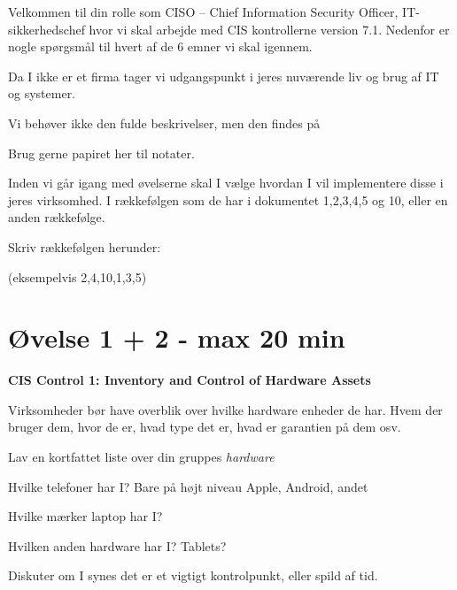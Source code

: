 \documentclass[a4paper,11pt,notitlepage,landscape]{report}
\begin{document}
\rm
{}

\newcommand{\subject}[1]{Workshop 3: cybersikkerhed i virksomheder}



\normal

Velkommen til din rolle som CISO -- Chief Information Security Officer, IT-sikkerhedschef hvor vi skal arbejde med CIS kontrollerne version 7.1. Nedenfor er nogle spørgsmål til hvert af de 6 emner vi skal igennem.

Da I ikke er et firma tager vi udgangspunkt i jeres nuværende liv og brug af IT og systemer.

Vi behøver ikke den fulde beskrivelser, men den findes på 

Brug gerne papiret her til notater.

Inden vi går igang med øvelserne skal I vælge hvordan I vil implementere disse i jeres virksomhed. I rækkefølgen som de har i dokumentet 1,2,3,4,5 og 10, eller en anden rækkefølge.

Skriv rækkefølgen herunder:

\vskip 5mm
(eksempelvis 2,4,10,1,3,5)

\eject
\section*{Øvelse 1 + 2 - max 20 min}

{\bf CIS Control 1: Inventory and Control of Hardware Assets}

Virksomheder bør have overblik over hvilke hardware enheder de har. Hvem der bruger dem, hvor de er, hvad type det er, hvad er garantien på dem osv.

Lav en kortfattet liste over din gruppes \emph{hardware}

\begin{list1}
\item[\faSquareO] Hvilke telefoner har I? Bare på højt niveau Apple, Android, andet
\item[\faSquareO] Hvilke mærker laptop har I?
\item[\faSquareO] Hvilken anden hardware har I? Tablets?
\end{list1}

Diskuter om I synes det er et vigtigt kontrolpunkt, eller spild af tid.
\end{document}

